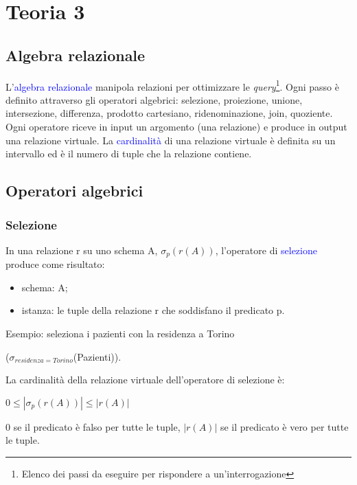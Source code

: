 \chapter{Teoria 3}

\section{Algebra relazionale}

L'\textcolor{blue}{algebra relazionale} manipola relazioni per ottimizzare le \textit{query}\footnote{Elenco dei passi da eseguire per rispondere a un'interrogazione}. Ogni passo è definito attraverso gli operatori algebrici: selezione, proiezione, unione, intersezione, differenza, prodotto cartesiano, ridenominazione, join, quoziente. Ogni operatore riceve in input un argomento (una relazione) e produce in output una relazione virtuale. La \textcolor{blue}{cardinalità} di una relazione virtuale è definita su un intervallo ed è il numero di tuple che la relazione contiene.

\section{Operatori algebrici}

\subsection{Selezione}

\label{Operatore di selezione}

\label{Selezione}

In una relazione r su uno schema A, $\sigma_p(r(A))$, l’operatore di \textcolor{blue}{selezione} produce come risultato:
\begin{itemize}
    \item schema: A;
    \item istanza: le tuple della relazione r che soddisfano il predicato p.
\end{itemize}

Esempio: seleziona i pazienti con la residenza a Torino 

($\sigma_{residenza=Torino}$(Pazienti)).

La cardinalità della relazione virtuale dell'operatore di selezione è: 

$0 \leq |\sigma_p(r(A))| \leq |r(A)|$

0 se il predicato è falso per tutte le tuple, $|r(A)|$ se il predicato è vero per tutte le tuple.


